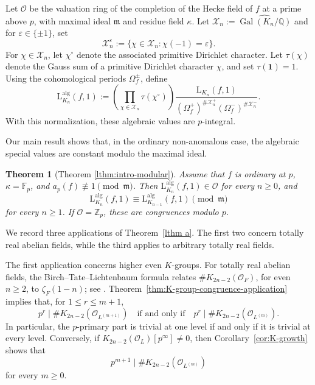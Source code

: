 \documentclass[11pt,table]{amsart}
\newtheorem{lthm}{Theorem}
\newcommand{\Gal}{\op{Gal}}
\newcommand{\Z}{\mathbb{Z}}
\newcommand{\Q}{\mathbb{Q}}
\newcommand{\F}{\mathbb{F}}
\newcommand{\op}[1]{\operatorname{#1}}
\numberwithin{equation}{section}
\begin{document}
\par Let \(\mathcal O\) be the valuation ring of the completion of the
Hecke field of \(f\) at a prime above \(p\), with maximal ideal
\(\mathfrak m\) and residue field \(\kappa\). Let $\mathcal X_n:=\widehat{\Gal(K_n/\Q)}$ and for \(\varepsilon\in\{\pm1\}\), set
\[
        \mathcal X_n^\varepsilon
        :=
        \{\chi\in\mathcal X_n:\chi(-1)=\varepsilon\}.
\]
For \(\chi\in\mathcal X_n\), let \(\chi^\circ\) denote the associated
primitive Dirichlet character. Let \(\tau(\chi)\) denote the Gauss sum
of a primitive Dirichlet character \(\chi\), and set \(\tau(\mathbf1)=1\). Using the
cohomological periods \(\Omega_f^\pm\), define
\[
        \mathrm{L}_{K_n}^{\mathrm{alg}}(f,1)
        :=
        \left(
        \prod_{\chi\in\mathcal X_n}\tau(\chi^\circ)
        \right)
        \frac{\mathrm{L}_{K_n}(f,1)}
        {(\Omega_f^+)^{\#\mathcal X_n^+}
         (\Omega_f^-)^{\#\mathcal X_n^-}}.
\]
With this normalization, these algebraic values are \(p\)-integral.

\par Our main result shows that, in the ordinary non-anomalous case, the
algebraic special values are constant modulo the maximal ideal.

\begin{lthm}
[Theorem \ref{lthm:intro-modular}]\label{thm b}
Assume that \(f\) is ordinary at \(p\),
\(\kappa=\F_p\), and
\(a_p(f)\not\equiv1\pmod{\mathfrak m}\).  Then
\(\mathrm{L}_{K_n}^{\mathrm{alg}}(f,1)\in\mathcal O\) for every \(n\geq0\), and
\[
        \mathrm{L}_{K_n}^{\mathrm{alg}}(f,1)
        \equiv
        \mathrm{L}_{K_{n-1}}^{\mathrm{alg}}(f,1)\pmod{\mathfrak m}
\]
for every \(n\geq1\). If \(\mathcal O=\Z_p\), these are congruences modulo \(p\).
\end{lthm}

\par We record three applications of Theorem~\ref{lthm a}.  The first two
concern totally real abelian fields, while the third applies to arbitrary
totally real fields.

\par The first application concerns higher even \(K\)-groups.  For totally
real abelian fields, the Birch--Tate--Lichtenbaum formula relates
\(\#K_{2n-2}(\mathcal O_F)\), for even \(n\geq2\), to
\(\zeta_F(1-n)\); see
\cite{Garland1971,Quillen1973,Borel1977,Lichtenbaum1972,Lichtenbaum1973}. Theorem~\ref{thm:K-group-congruence-application} implies
that, for \(1\leq r\leq m+1\),
\[
        p^r\mid\#K_{2n-2}(\mathcal O_{L^{(m+1)}})
        \quad\text{if and only if}\quad
        p^r\mid\#K_{2n-2}(\mathcal O_{L^{(m)}}).
\]
In particular, the \(p\)-primary part is trivial at one level if and
only if it is trivial at every level.  Conversely, if
\(K_{2n-2}(\mathcal O_L)[p^\infty]\neq0\), then
Corollary~\ref{cor:K-growth} shows that
\[
        p^{m+1}\mid
        \#K_{2n-2}(\mathcal O_{L^{(m)}})
\]
for every \(m\geq0\).
\end{document}

